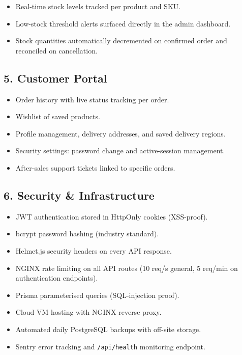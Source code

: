 \documentclass[11pt,a4paper]{article}
\begin{document}
\begin{itemize}[leftmargin=1.4em,itemsep=3pt]
  \item Real-time stock levels tracked per product and SKU.
  \item Low-stock threshold alerts surfaced directly in the admin
        dashboard.
  \item Stock quantities automatically decremented on confirmed
        order and reconciled on cancellation.
\end{itemize}

\subsection{5. Customer Portal}

\begin{itemize}[leftmargin=1.4em,itemsep=3pt]
  \item Order history with live status tracking per order.
  \item Wishlist of saved products.
  \item Profile management, delivery addresses, and saved delivery
        regions.
  \item Security settings: password change and active-session
        management.
  \item After-sales support tickets linked to specific orders.
\end{itemize}

\subsection{6. Security \& Infrastructure}

\begin{itemize}[leftmargin=1.4em,itemsep=3pt]
  \item JWT authentication stored in HttpOnly cookies (XSS-proof).
  \item bcrypt password hashing (industry standard).
  \item Helmet.js security headers on every API response.
  \item NGINX rate limiting on all API routes (10 req/s general,
        5 req/min on authentication endpoints).
  \item Prisma parameterised queries (SQL-injection proof).
  \item Cloud VM hosting with NGINX reverse proxy.
  \item Automated daily PostgreSQL backups with off-site storage.
  \item Sentry error tracking and \texttt{/api/health} monitoring
        endpoint.
\end{itemize}
\end{document}
